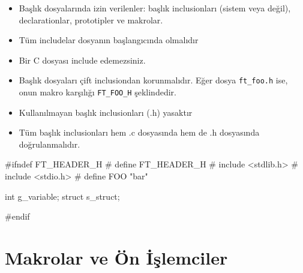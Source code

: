 \documentclass{42-en}
\begin{document}
        \begin{itemize}

            \item Başlık dosyalarında izin verilenler: başlık inclusionları (sistem veya değil), declarationlar, prototipler ve
makrolar.

            \item Tüm includelar dosyanın başlangıcında olmalıdır

            \item Bir C dosyası include edemezsiniz.

            \item Başlık dosyaları çift inclusiondan korunmalıdır. Eğer dosya \texttt{ft\_foo.h} ise, onun makro karşılığı \texttt{FT\_FOO\_H}
şeklindedir.

            \item Kullanılmayan başlık inclusionları (.h) yasaktır

            \item Tüm başlık inclusionları hem .c dosyasında hem de .h dosyasında doğrulanmalıdır.

        \end{itemize}

        \begin{42ccode}
#ifndef FT_HEADER_H
# define FT_HEADER_H
# include <stdlib.h>
# include <stdio.h>
# define FOO "bar"

int		g_variable;
struct	s_struct;

#endif
        \end{42ccode}
        \newpage

    \section{Makrolar ve Ön İşlemciler}
\end{document}
